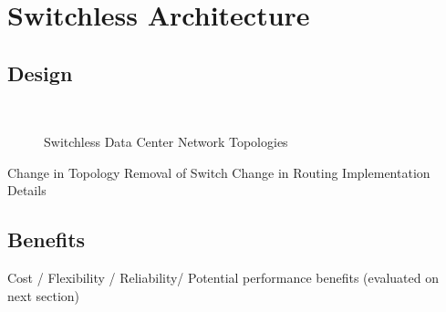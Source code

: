 \section{Switchless Architecture}
\label{sec:arch}
\subsection{Design}


\begin{figure}
    \centering
    \\
    \vspace{-0.05in}
    \vspace{-0.07in}
    \caption{Switchless Data Center Network Topologies}
    \label{fig:switchless_topos}
\end{figure}



Change in Topology
Removal of Switch
Change in Routing
Implementation Details
\subsection{Benefits}
Cost / Flexibility / Reliability/ Potential performance benefits (evaluated on next section)
